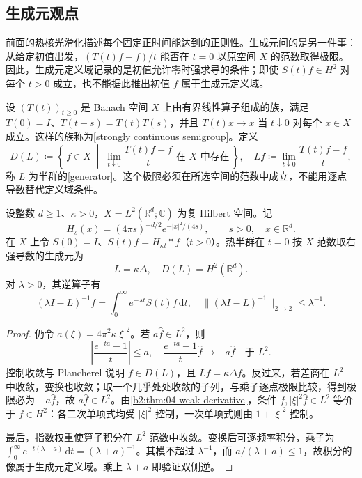 \subsection{生成元观点}
\label{b2:subsec:120403}

前面的热核光滑化描述每个固定正时间能达到的正则性。生成元问的是另一件事：从给定初值出发，\((T(t)f-f)/t\) 能否在 \(t=0\) 以原空间 \(X\) 的范数取得极限。因此，生成元定义域记录的是初值允许零时强求导的条件；即使 \(S(t)f\in H^2\) 对每个 \(t>0\) 成立，也不能据此推出初值 \(f\) 属于生成元定义域。

\ProseParagraphBreak

设 \((T(t))_{t\geq0}\) 是 Banach 空间 \(X\) 上由有界线性算子组成的族，满足 \(T(0)=I\)、\(T(t+s)=T(t)T(s)\)，并且 \(T(t)x\to x\) 当 \(t\downarrow0\) 对每个 \(x\in X\) 成立。这样的族称为[strongly continuous semigroup]。定义
\begin{equation}\label{b2:eq:12-generator-def}
 D(L)\coloneqq\left\{\,f\in X\;\middle|\;
 \lim_{t\downarrow0}\dfrac{T(t)f-f}{t}\text{ 在 }X\text{ 中存在}\,\right\},
 \quad Lf\coloneqq\lim_{t\downarrow0}\dfrac{T(t)f-f}{t},
\end{equation}
称 \(L\) 为半群的[generator]。这个极限必须在所选空间的范数中成立，不能用逐点导数替代定义域条件。

\begin{theorem}[热半群的平方可积生成元]\label{b2:thm:12-generator-l2}
设整数 \(d\geq1\)、\(\kappa>0\)，\(X=L^2(\mathbb R^d;\mathbb C)\) 为复 Hilbert 空间。记
\[
 H_s(x)=(4\pi s)^{-d/2}e^{-|x|^2/(4s)},
 \qquad s>0,\quad x\in\mathbb R^d.
\]
在 \(X\) 上令 \(S(0)=I\)、\(S(t)f=H_{\kappa t}*f\)（\(t>0\)）。热半群在 \(t=0\) 按 \(X\) 范数取右强导数的生成元为
\[
 L=\kappa\Delta,
 \quad D(L)=H^2(\mathbb R^d).
\]
对 \(\lambda>0\)，其逆算子有
\[
 (\lambda I-L)^{-1}f=\int_0^\infty e^{-\lambda t}S(t)f\,\mathrm{d}t,
 \quad\|(\lambda I-L)^{-1}\|_{2\to2}\leq\lambda^{-1}.
\]
\end{theorem}
\begin{proof}
仍令 \(a(\xi)=4\pi^2\kappa|\xi|^2\)。若 \(a\widehat f\in L^2\)，则
\[
 \left|\dfrac{e^{-ta}-1}{t}\right|\leq a,
 \quad\dfrac{e^{-ta}-1}{t}\widehat f\longrightarrow-a\widehat f
 \quad\text{于 }L^2.
\]
控制收敛与 Plancherel 说明 \(f\in D(L)\)，且 \(Lf=\kappa\Delta f\)。反过来，若差商在 \(L^2\) 中收敛，变换也收敛；取一个几乎处处收敛的子列，与乘子逐点极限比较，得到极限必为 \(-a\widehat f\)，故 \(a\widehat f\in L^2\)。由\cref{b2:thm:04-weak-derivative}，条件 \(f,|\xi|^2\widehat f\in L^2\) 等价于 \(f\in H^2\)：各二次单项式均受 \(|\xi|^2\) 控制，一次单项式则由 \(1+|\xi|^2\) 控制。

最后，指数权重使算子积分在 \(L^2\) 范数中收敛。变换后可逐频率积分，乘子为 \(\int_0^\infty e^{-t(\lambda+a)}\,\mathrm{d}t=(\lambda+a)^{-1}\)。其模不超过 \(\lambda^{-1}\)，而 \(a/(\lambda+a)\leq1\)，故积分的像属于生成元定义域。乘上 \(\lambda+a\) 即验证双侧逆。
\end{proof}

